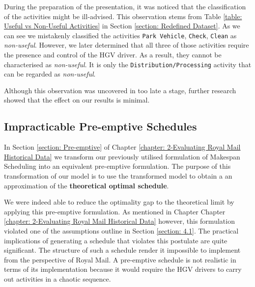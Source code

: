 \vspace{\baselineskip}
\noindent
During the preparation of the presentation, it was noticed that the classification of the activities might be ill-advised. This observation stems from Table \ref{table: Useful vs Non-Useful Activities} in Section \ref{section: Redefined Dataset}. As we can see we mistakenly classified the activities \texttt{Park Vehicle}, \texttt{Check}, \texttt{Clean} as \textit{non-useful}. However, we later determined that all three of those activities require the presence and control of the HGV driver. As a result, they cannot be characterised as \textit{non-useful}. It is only the \texttt{Distribution/Processing} activity that can be regarded as \textit{non-useful}.

\vspace{\baselineskip}
\noindent
Although this observation was uncovered in too late a stage, further research showed that the effect on our results is minimal. 

\subsection*{Impracticable Pre-emptive Schedules}
In Section \ref{section: Pre-emptive} of Chapter \ref{chapter: 2-Evaluating Royal Mail Historical Data} we transform our previously utilised formulation of Makespan Scheduling into an equivalent pre-emptive formulation. The purpose of this transformation of our model is to use the transformed model to obtain a an approximation of the \textbf{theoretical optimal schedule}. 

\vspace{\baselineskip}
\noindent
We were indeed able to reduce the optimality gap to the theoretical limit by applying this pre-emptive formulation. As mentioned in Chapter Chapter \ref{chapter: 2-Evaluating Royal Mail Historical Data} however, this formulation violated one of the assumptions outline in Section \ref{section: 4.1}. The practical implications of generating a schedule that violates this postulate are quite significant. The structure of such a schedule render it impossible to implement from the perspective of Royal Mail. A pre-emptive schedule is not realistic in terms of its implementation because it would require the HGV drivers to carry out activities in a chaotic sequence. 

